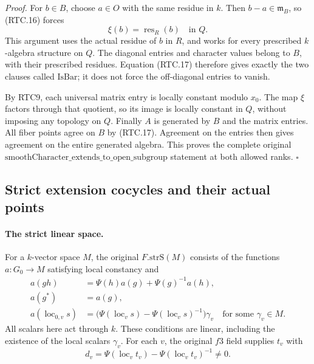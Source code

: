 \documentclass[11pt,a4paper]{article}
\numberwithin{equation}{section}
\theoremstyle{remark}\newtheorem{remark}[theorem]{Remark}
\begin{document}
\emph{Proof.}
For \(b\in B\), choose \(a\in O\) with the same residue in
\(k\).  Then \(b-a\in\mathfrak m_B\), so (RTC.16) forces
\[
 \xi(b)=\operatorname{res}_R(b)\quad\text{in }Q.
                                                        \tag{RTC.17}
\]
This argument uses the actual residue of \(b\) in \(R\), and
works for every prescribed \(k\)-algebra structure on \(Q\).
The diagonal entries and character values belong to \(B\), with
their prescribed residues.  Equation (RTC.17) therefore gives
exactly the two clauses called \(\mathrm{IsBar}\); it does not
force the off-diagonal entries to vanish.

By RTC9, each universal matrix entry is locally constant modulo
\(x_0\).  The map \(\xi\) factors through that quotient,
so its image is locally constant in \(Q\), without imposing
any topology on \(Q\).  Finally \(A\) is generated by \(B\)
and the matrix entries.  All fiber points agree on \(B\) by
(RTC.17).  Agreement on the entries then gives agreement on the
entire generated algebra.  This proves the complete original
\(\mathrm{smoothCharacter\_\allowbreak extends\_\allowbreak to\_\allowbreak open\_\allowbreak subgroup}\)
statement at both allowed ranks. \hfill\(\square\)

\subsection{Strict extension cocycles and their actual points}

\paragraph{The strict linear space.}
For a \(k\)-vector space \(M\), the original
\(F.\mathrm{strS}(M)\) consists of the functions
\(a:G_0\to M\) satisfying local constancy and
\[
 \begin{aligned}
 a(gh)&=\Psi(h)a(g)+\Psi(g)^{-1}a(h),\\
 a(g^*)&=a(g),\\
 a(\operatorname{loc}_{0,v}s)
   &=\bigl(\Psi(\operatorname{loc}_v s)
               -\Psi(\operatorname{loc}_v s)^{-1}\bigr)\gamma_v
       \quad\text{for some }\gamma_v\in M.
 \end{aligned}                                             \tag{RTC.18}
\]
All scalars here act through \(k\).  These conditions are linear,
including the existence of the local scalars \(\gamma_v\).
For each \(v\), the original \(f3\) field supplies \(t_v\)
with
\[
 d_v=\Psi(\operatorname{loc}_v t_v)
             -\Psi(\operatorname{loc}_v t_v)^{-1}\ne0.
                                                        \tag{RTC.19}
\]
\end{document}
